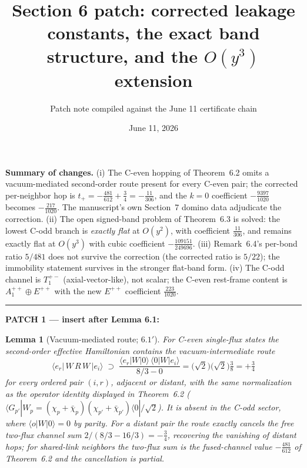 \documentclass[11pt]{article}
\title{Section 6 patch: corrected leakage constants, the exact band structure,
and the $O(y^3)$ extension}
\author{Patch note compiled against the June 11 certificate chain}
\date{June 11, 2026}
\newtheorem{lemma}[theorem]{Lemma}
\begin{document}
\maketitle

\noindent\textbf{Summary of changes.}
(i) The C-even hopping of Theorem~6.2 omits a vacuum-mediated second-order
route present for every C-even pair; the corrected per-neighbor hop is
$t_+=-\tfrac{481}{612}+\tfrac34=-\tfrac{11}{306}$, and the $k=0$ coefficient
$-\tfrac{9397}{1020}$ becomes $-\tfrac{217}{1020}$. The manuscript's own
Section~7 domino data adjudicate the correction. (ii) The open signed-band
problem of Theorem~6.3 is solved: the lowest C-odd branch is \emph{exactly
flat} at $O(y^2)$, with coefficient $\tfrac{11}{306}$, and remains exactly
flat at $O(y^3)$ with cubic coefficient $-\tfrac{109151}{249696}$.
(iii) Remark~6.4's per-bond ratio $5/481$ does not survive the correction
(the corrected ratio is $5/22$); the immobility statement survives in the
stronger flat-band form. (iv) The C-odd channel is $T_1^{+-}$
(axial-vector-like), not scalar; the C-even rest-frame content is
$A_1^{++}\oplus E^{++}$ with the new $E^{++}$ coefficient $\tfrac{223}{1020}$.

\medskip\hrule\medskip
\noindent\textbf{PATCH 1 --- insert after Lemma 6.1:}

\begin{lemma}[Vacuum-mediated route; $6.1'$]\label{lem:vacroute}
For C-even single-flux states the second-order effective Hamiltonian contains
the vacuum-intermediate route
\begin{equation}
\langle e_r|\,W\,R\,W\,|e_i\rangle \;\supset\;
\frac{\langle e_r|W|0\rangle\,\langle 0|W|e_i\rangle}{\,8/3-0\,}
=\bigl(\sqrt2\bigr)\bigl(\sqrt2\bigr)\tfrac38=+\tfrac34
\tag{$19'$}
\end{equation}
for \emph{every} ordered pair $(i,r)$, adjacent or distant, with the same
normalization as the operator identity displayed in Theorem~6.2
($\langle G_{p'}|W_p=(\chi_p+\bar\chi_p)(\chi_{p'}+\bar\chi_{p'})\langle
0|/\sqrt2$). It is absent in the C-odd sector, where
$\langle o|W|0\rangle=0$ by parity. For a \emph{distant} pair the route
exactly cancels the free two-flux channel sum
$2/(8/3-16/3)=-\tfrac34$, recovering the vanishing of distant hops; for
shared-link neighbors the two-flux sum is the fused-channel value
$-\tfrac{481}{612}$ of Theorem~6.2 and the cancellation is partial.
\end{lemma}
\end{document}
